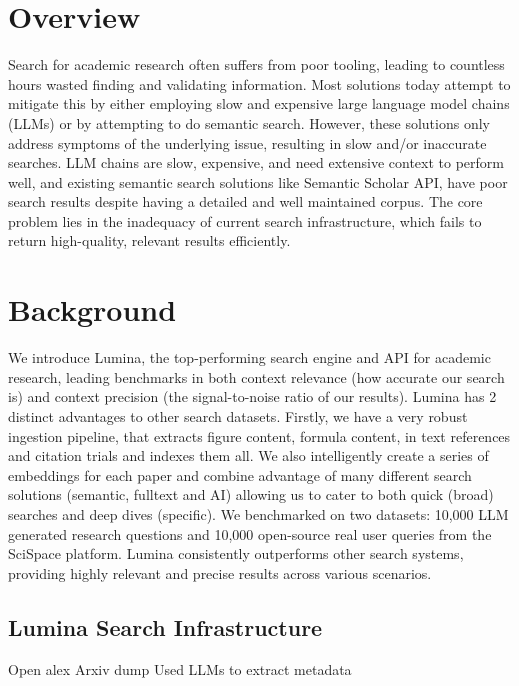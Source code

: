 \documentclass{article}
\begin{document}
\begin{multicols}{2}

\section{Overview}
Search for academic research often suffers from poor tooling, leading to countless hours wasted finding and validating information. Most solutions today attempt to mitigate this by either employing slow and expensive large language model chains (LLMs) or by attempting to do semantic search. However, these solutions only address symptoms of the underlying issue, resulting in slow and/or inaccurate searches. LLM chains are slow, expensive, and need extensive context to perform well, and existing semantic search solutions like Semantic Scholar API, have poor search results despite having a detailed and well maintained corpus. The core problem lies in the inadequacy of current search infrastructure, which fails to return high-quality, relevant results efficiently.

\section{Background}
We introduce Lumina, the top-performing search engine and API for academic research, leading benchmarks in both context relevance (how accurate our search is) and context precision (the signal-to-noise ratio of our results). 
Lumina has 2 distinct advantages to other search datasets. Firstly, we have a very robust ingestion pipeline, that extracts figure content, formula content, in text references and citation trials and indexes them all. We also intelligently create a series of embeddings for each paper and combine advantage of many different search solutions (semantic, fulltext and AI) allowing us to cater to both quick (broad) searches and deep dives (specific).
We benchmarked on two datasets: 10,000 LLM generated research questions and 10,000 open-source real user queries from the SciSpace platform. Lumina consistently outperforms other search systems, providing highly relevant and precise results across various scenarios.

\subsection{Lumina Search Infrastructure}

Open alex
Arxiv dump
Used LLMs to extract metadata

\end{multicols}
\end{document}
